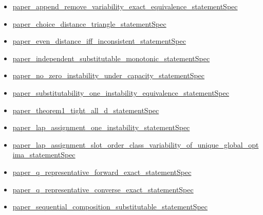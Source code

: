 \documentclass[10pt]{article}
\begin{document}
\begin{itemize}[leftmargin=1.2em]
\begin{itemize}[leftmargin=1.2em]
\item \hyperlink{source-claim-fff538b4a617e0f3}{paper\_\allowbreak{}append\_\allowbreak{}remove\_\allowbreak{}variability\_\allowbreak{}exact\_\allowbreak{}equivalence\_\allowbreak{}statement\allowbreak{}Spec}
\item \hyperlink{source-claim-e1e0f5f892109672}{paper\_\allowbreak{}choice\_\allowbreak{}distance\_\allowbreak{}triangle\_\allowbreak{}statement\allowbreak{}Spec}
\item \hyperlink{source-claim-f8de55f9c5760a87}{paper\_\allowbreak{}even\_\allowbreak{}distance\_\allowbreak{}iff\_\allowbreak{}inconsistent\_\allowbreak{}statement\allowbreak{}Spec}
\item \hyperlink{source-claim-3e732abc6f7366e9}{paper\_\allowbreak{}independent\_\allowbreak{}substitutable\_\allowbreak{}monotonic\_\allowbreak{}statement\allowbreak{}Spec}
\item \hyperlink{source-claim-dac748564d615cb6}{paper\_\allowbreak{}no\_\allowbreak{}zero\_\allowbreak{}instability\_\allowbreak{}under\_\allowbreak{}capacity\_\allowbreak{}statement\allowbreak{}Spec}
\item \hyperlink{source-claim-4efb65f58e4bc480}{paper\_\allowbreak{}substitutability\_\allowbreak{}one\_\allowbreak{}instability\_\allowbreak{}equivalence\_\allowbreak{}statement\allowbreak{}Spec}
\item \hyperlink{source-claim-d2442dd19c06f77a}{paper\_\allowbreak{}theorem1\_\allowbreak{}tight\_\allowbreak{}all\_\allowbreak{}d\_\allowbreak{}statement\allowbreak{}Spec}
\item \hyperlink{source-claim-b3ee09f1e9e6b10d}{paper\_\allowbreak{}lap\_\allowbreak{}assignment\_\allowbreak{}one\_\allowbreak{}instability\_\allowbreak{}statement\allowbreak{}Spec}
\item \hyperlink{source-claim-a0520310d6532be1}{paper\_\allowbreak{}lap\_\allowbreak{}assignment\_\allowbreak{}slot\_\allowbreak{}order\_\allowbreak{}class\_\allowbreak{}variability\_\allowbreak{}of\_\allowbreak{}unique\_\allowbreak{}global\_\allowbreak{}optima\_\allowbreak{}statement\allowbreak{}Spec}
\item \hyperlink{source-claim-a9c5e5d5c616ab58}{paper\_\allowbreak{}q\_\allowbreak{}representative\_\allowbreak{}forward\_\allowbreak{}exact\_\allowbreak{}statement\allowbreak{}Spec}
\item \hyperlink{source-claim-3d12c759820fa6e4}{paper\_\allowbreak{}q\_\allowbreak{}representative\_\allowbreak{}converse\_\allowbreak{}exact\_\allowbreak{}statement\allowbreak{}Spec}
\item \hyperlink{source-claim-5fcefe7f9430bc35}{paper\_\allowbreak{}sequential\_\allowbreak{}composition\_\allowbreak{}substitutable\_\allowbreak{}statement\allowbreak{}Spec}

\end{itemize}
\end{itemize}
\end{document}
